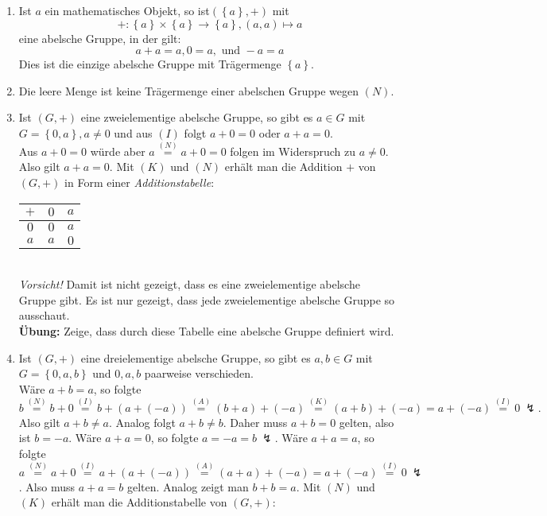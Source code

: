 \documentclass[../../main.tex]{subfiles}
\begin{document}
\begin{bsp}\label{2.1.3}
\begin{enumerate}[\normalfont(a)]
\item Ist $a$ ein mathematisches Objekt, so ist$(\left\{a\right\},+)$ mit
$$+:\left\{a\right\}\times\left\{a\right\}\rightarrow \left\{a\right\}, (a,a)\mapsto a$$
eine abelsche Gruppe, in der gilt:
$$a+a = a, 0=a, \text{ und } -a=a$$
Dies ist die einzige abelsche Gruppe mit Trägermenge $\left\{a\right\}$.
\item Die leere Menge ist keine Trägermenge einer abelschen Gruppe wegen $(N)$.
\item Ist $(G,+)$ eine zweielementige abelsche Gruppe, so gibt es $a\in G$ mit $G=\left\{0,a\right\}, a\neq 0$ und aus $(I)$ folgt $a+0=0$ oder $a+a=0$.\\
Aus $a+0=0$ würde aber $a\overset{(N)}= a+0=0$ folgen im Widerspruch zu $a\neq 0$. Also gilt $a+a=0$. Mit $(K)$ und $(N)$ erhält man die Addition $+$ von $(G,+)$ in Form einer \emph{Additionstabelle}:
\begin{table}[h]
\centering
\begin{tabular}{c|cc}
 $+$ & $0$ & $a$ \\\hline
 $0$ & $0$ & $a$ \\
 $a$ & $a$ & $0$
\end{tabular}
\end{table}\\
\emph{Vorsicht!} Damit ist nicht gezeigt, dass es eine zweielementige abelsche Gruppe gibt. Es ist nur gezeigt, dass jede zweielementige abelsche Gruppe so ausschaut.\\
\textbf{Übung:} Zeige, dass durch diese Tabelle eine abelsche Gruppe definiert wird.
\item Ist $(G,+)$ eine dreielementige abelsche Gruppe, so gibt es $a,b\in G$ mit $G=\left\{0,a,b\right\}$ und $0,a,b$ paarweise verschieden.\\
Wäre $a+b=a$, so folgte 
$$b\overset{(N)}=b+0\overset{(I)}= b+(a+(-a))\overset{(A)}=(b+a)+(-a)\overset{(K)}=(a+b)+(-a)=a+(-a)\overset{(I)}=0 ~\lightning.$$
Also gilt $a+b\neq a$. Analog folgt $a+b\neq b$. Daher muss $a+b=0$ gelten, also ist $b=-a$. Wäre $a+a=0$, so folgte $a=-a=b ~\lightning$. Wäre $a+a=a$, so folgte $a\overset{(N)}=a+0\overset{(I)}= a+(a+(-a))\overset{(A)}=(a+a)+(-a)=a+(-a)\overset{(I)}=0 ~\lightning$. Also muss $a+a=b$ gelten. Analog zeigt man $b+b=a$. Mit $(N)$ und $(K)$ erhält man die Additionstabelle von $(G,+)$:
\begin{table}[h]
\centering
\begin{tabular}{c|ccc}

\end{tabular}
\end{table}
\end{enumerate}
\end{bsp}
\end{document}

